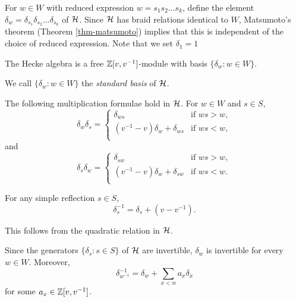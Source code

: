 For $w \in W$ with reduced expression $w = s_1 s_2 ... s_k$, define the element $\delta_w = \delta_{s_1}  \delta_{s_2} ... \delta_{s_k}$ of $\mathcal{H}$. Since $\mathcal{H}$ has braid relations identical to $W$, Matsumoto's theorem (Theorem \ref{thm-matsumoto}) implies that this is independent of the choice of reduced expression. Note that we set $\delta_1 = 1$


\begin{theorem}
    The Hecke algebra is a free $\mathbb{Z}[v,v^{-1}]$-module with basis $\{\delta_w : w \in W\}$.
\end{theorem}

\begin{definition}
    We call $\{\delta_w : w \in W\}$ the \textit{standard basis} of $\mathcal{H}$.
\end{definition}


\begin{proposition}
    The following multiplication formulae hold in $\mathcal{H}$. For $w \in W$ and $s \in S$,
    \[
        \delta_w \delta_s =
        \begin{cases}
            \delta_{ws}                        & \text{if } ws > w, \\
            (v^{-1} - v)\delta_w + \delta_{ws} & \text{if } ws < w, \\
        \end{cases}
    \]
    and
    \[
        \delta_s \delta_w =
        \begin{cases}
            \delta_{sw}                        & \text{if } ws > w, \\
            (v^{-1} - v)\delta_w + \delta_{sw} & \text{if } ws < w. \\
        \end{cases}
    \]
\end{proposition}

\begin{proposition}
    For any simple reflection $s \in S$,
    \[
        \delta_s^{-1} = \delta_s + (v - v^{-1}).
    \]
\end{proposition}
This follows from the quadratic relation in $\mathcal{H}$.

\begin{proposition}
    Since the generators $\{\delta_s : s \in S\}$ of $\mathcal{H}$ are invertible, $\delta_w$ is invertible for every $w \in W$. Moreover,
    \[
        \delta_{w^{-1}}^{-1} = \delta_w + \sum_{x < w} a_x \delta_x
    \]
    for some $a_x \in \mathbb{Z}[v,v^{-1}]$.
\end{proposition}

